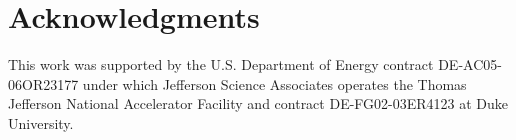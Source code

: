 \documentclass[10pt,aps,prc,twocolumn]{revtex4-1}
\begin{document}
\section{Acknowledgments}

This work was supported by the U.S.  Department of Energy contract DE-AC05-06OR23177
under which Jefferson Science Associates operates the Thomas Jefferson National 
Accelerator Facility and contract DE-FG02-03ER4123 at Duke University.


\end{document}

